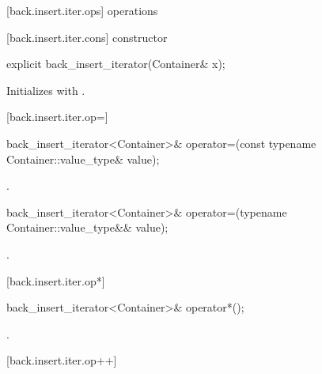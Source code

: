 [back.insert.iter.ops]{ operations}

[back.insert.iter.cons]{ constructor}

%
\begin{itemdecl}
explicit back_insert_iterator(Container& x);
\end{itemdecl}

\begin{itemdescr}
\pnum
\effects
Initializes
with .
\end{itemdescr}

[back.insert.iter.op=]{}

%
\begin{itemdecl}
back_insert_iterator<Container>&
  operator=(const typename Container::value_type& value);
\end{itemdecl}

\begin{itemdescr}
\pnum
\effects
{}

\pnum
\returns
{}.
\end{itemdescr}

%
\begin{itemdecl}
back_insert_iterator<Container>&
  operator=(typename Container::value_type&& value);
\end{itemdecl}

\begin{itemdescr}
\pnum
\effects
{}

\pnum
\returns
{}.
\end{itemdescr}

[back.insert.iter.op*]{}

%
\begin{itemdecl}
back_insert_iterator<Container>& operator*();
\end{itemdecl}

\begin{itemdescr}
\pnum
\returns
{}.
\end{itemdescr}

[back.insert.iter.op++]{}

